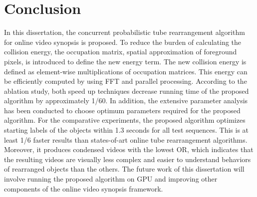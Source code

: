 \documentclass[11pt]{hyu_thesis}
\begin{document}
\chapter{Conclusion}
\label{sec:conc}
In this dissertation, the concurrent probabilistic tube rearrangement algorithm for online video synopsis is proposed. To reduce the burden of calculating the collision energy, the occupation matrix, spatial approximation of foreground pixels, is introduced to define the new energy term. The new collision energy is defined as element-wise multiplications of occupation matrices. This energy can be efficiently computed by using FFT and parallel processing. According to the ablation study, both speed up techniques decrease running time of the proposed algorithm by approximately 1/60. In addition, the extensive parameter analysis has been conducted to choose optimum parameters required for the proposed algorithm. For the comparative experiments, the proposed algorithm optimizes starting labels of the objects within 1.3 seconds for all test sequences. This is at least 1/6 faster results than states-of-art online tube rearrangement algorithms. Moreover, it produces condensed videos with the lowest OR, which indicates that the resulting videos are visually less complex and easier to understand behaviors of rearranged objects than the others. The future work of this dissertation will involve running the proposed algorithm on GPU and improving other components of the online video synopsis framework.



\end{document}
